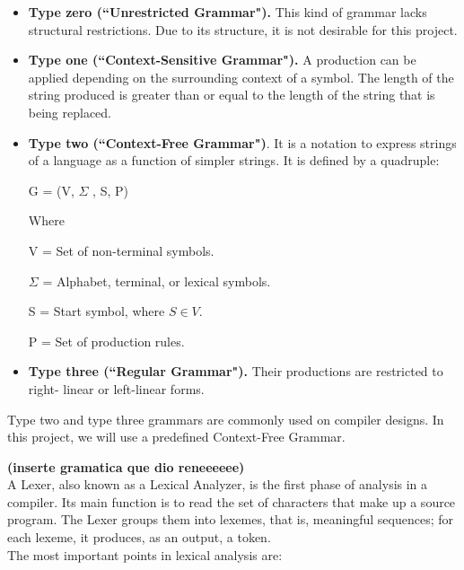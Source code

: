 \documentclass[letterpaper,12pt,oneside]{article}
\begin{document}
\begin{itemize}
\item \textbf{Type zero (``Unrestricted Grammar").} This kind of grammar lacks structural restrictions. Due to its structure, it is not desirable for this project.
\item \textbf{Type one (``Context-Sensitive Grammar").} A production can be applied depending on the surrounding context of a symbol. The length of the string produced is greater than or equal to the length of the string that is being replaced.
\item \textbf{Type two (``Context-Free Grammar")}. It is a notation to express strings of a language as a function of simpler strings. It is defined by a quadruple:

\begin{center}
G = (V, \(\Sigma\) , S, P)
\end{center}
Where

V = Set of non-terminal symbols.

 \(\Sigma\) = Alphabet, terminal, or lexical symbols.

S = Start symbol, where $S \in V$.

P = Set of production rules.

\item \textbf{Type three (``Regular Grammar").} Their productions are restricted to right- linear or left-linear forms.

\end{itemize}

Type two and type three grammars are commonly used on compiler designs. In this project, we will use a predefined Context-Free Grammar.

\textbf{(inserte gramatica que dio reneeeeee)}\\

A Lexer, also known as a Lexical Analyzer, is the first phase of analysis in a compiler. Its main function is to read the set of characters that make up a source program. The Lexer groups them into lexemes, that is, meaningful sequences; for each lexeme, it produces, as an output, a token.\\

The most important points in lexical analysis are:
\end{document}
